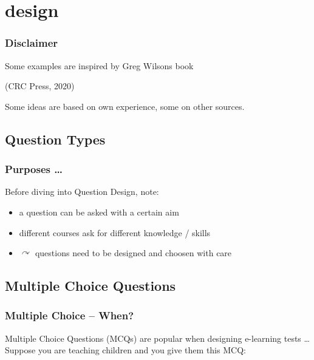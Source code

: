 \section[Designing Questions]{design}

\begin{frame}
  \frametitle{Disclaimer}
  Some examples are inspired by Greg Wilsons book
 \begin{center}
   (CRC Press, 2020)
 \end{center}
 Some ideas are based on own experience, some on other sources.
\end{frame}

\subsection{Question Types}

\begin{frame}
  \frametitle{Purposes \ldots}
  Before diving into Question Design, note:
  \begin{itemize}
    \item a question can be asked with a certain aim
    \item different courses ask for different knowledge / skills
    \item $\curvearrowright$ questions need to be designed and choosen with care
  \end{itemize}
\end{frame}


\subsection{Multiple Choice Questions}

\begin{frame}
 \frametitle{Multiple Choice -- When?}

 Multiple Choice Questions (MCQs) are popular when designing e-learning tests \ldots\vspace{-1em}
 \pause
 \newline
 \pause
 Suppose you are teaching children and you give them this MCQ:
\end{frame}


